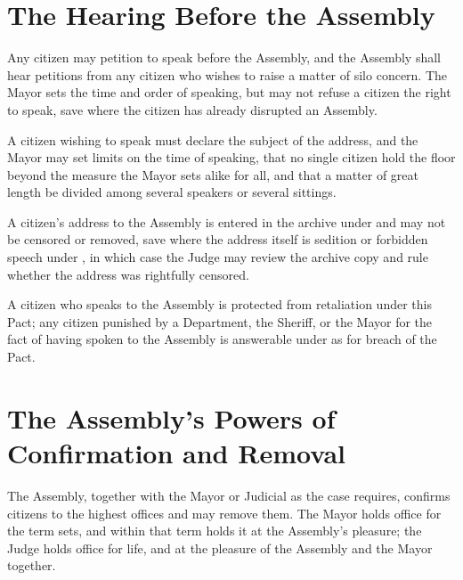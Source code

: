\section{The Hearing Before the Assembly}
\label{sec:assembly:hearing-before-the-assembly}

Any citizen may petition to speak before the Assembly, and the Assembly shall hear petitions from any citizen who wishes to raise a matter of silo concern. The Mayor sets the time and order of speaking, but may not refuse a citizen the right to speak, save where the citizen has already disrupted an Assembly.

\begin{clauses}
\item A citizen wishing to speak must declare the subject of the address, and the Mayor may set limits on the time of speaking, that no single citizen hold the floor beyond the measure the Mayor sets alike for all, and that a matter of great length be divided among several speakers or several sittings.
\item A citizen's address to the Assembly is entered in the archive under  and may not be censored or removed, save where the address itself is sedition or forbidden speech under , in which case the Judge may review the archive copy and rule whether the address was rightfully censored.
\item A citizen who speaks to the Assembly is protected from retaliation under this Pact; any citizen punished by a Department, the Sheriff, or the Mayor for the fact of having spoken to the Assembly is answerable under  as for breach of the Pact.
\end{clauses}

\section{The Assembly's Powers of Confirmation and Removal}
\label{sec:assembly:assemblys-powers-of-confirmation-and-removal}

The Assembly, together with the Mayor or Judicial as the case requires, confirms citizens to the highest offices and may remove them. The Mayor holds office for the term  sets, and within that term holds it at the Assembly's pleasure; the Judge holds office for life, and at the pleasure of the Assembly and the Mayor together.

